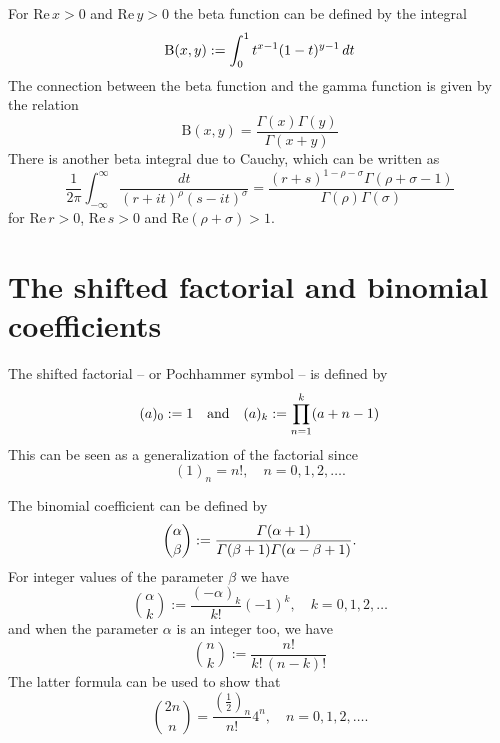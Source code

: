 \documentclass[envcountchap,graybox]{svmono}
\renewcommand{\Gamma}{\varGamma}
\begin{document}
For $\textrm{Re}\,x>0$ and $\textrm{Re}\,y>0$ the beta function can be defined
by the integral
\begin{equation}
\label{DefBeta}\index{Beta function}
\textrm{B}(x,y):=\int_0^1t^{x-1}(1-t)^{y-1}\,dt
\end{equation}
The connection between the beta function and the gamma function is
given by the relation
\begin{equation}
\label{BetaGamma}
\textrm{B}(x,y)=\frac{\Gamma(x)\Gamma(y)}{\Gamma(x+y)}
\end{equation}
There is another beta integral due to Cauchy, which can be written as
\begin{equation}
\label{Cauchy}
\frac{1}{2\pi}\int_{-\infty}^{\infty}\frac{dt}{(r+it)^{\rho}(s-it)^{\sigma}}
=\frac{(r+s)^{1-\rho-\sigma}\Gamma(\rho+\sigma-1)}{\Gamma(\rho)\Gamma(\sigma)}
\end{equation}
for $\textrm{Re}\,r>0$, $\textrm{Re}\,s>0$ and $\textrm{Re}(\rho+\sigma)>1$.

\section{The shifted factorial and binomial coefficients}
\par\setcounter{equation}{0}
\label{pochhammer symbol}

The shifted factorial -- or Pochhammer symbol -- is defined by
\begin{equation}
\label{Pochhammer}\index{Shifted factorial}
(a)_0:=1\quad\textrm{and}\quad (a)_k:=\prod_{n=1}^k(a+n-1)
\end{equation}
This can be seen as a generalization of the factorial since
$$(1)_n=n!,\quad n=0,1,2,\ldots.$$

The binomial coefficient can be defined by
\begin{equation}
\label{binomialcoeff}\index{Binomial coefficient}
\binom{\alpha}{\beta}:=\frac{\Gamma(\alpha+1)}{\Gamma(\beta+1)\Gamma(\alpha-\beta+1)}.
\end{equation}
For integer values of the parameter $\beta$ we have
$$\binom{\alpha}{k}:=\frac{(-\alpha)_k}{k!}(-1)^k,\quad k=0,1,2,\ldots$$
and when the parameter $\alpha$ is an integer too, we have
\begin{equation}
\binom{n}{k}:=\frac{n!}{k!\,(n-k)!}
\end{equation}
The latter formula can be used to show that
$$\binom{2n}{n}=\frac{\left(\frac{1}{2}\right)_n}{n!}4^n,\quad n=0,1,2,\ldots.$$
\end{document}
